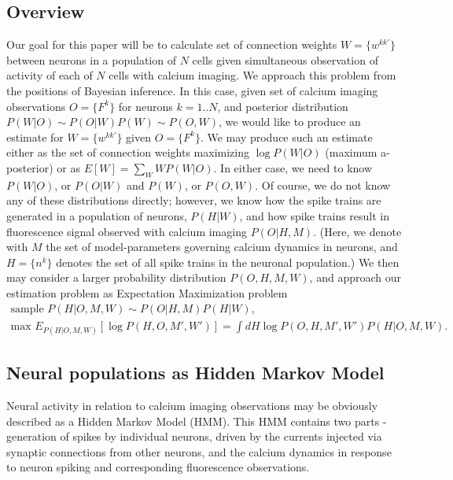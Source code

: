 \documentclass[amsmath,amssymb]{revtex4}
\begin{document}
\subsection{\label{sec:methods:introduction}Overview}
Our goal for this paper will be to calculate set of connection weights $W=\{w^{kk'}\}$ between neurons in a population of $N$ cells given simultaneous observation of activity of each of $N$ cells with calcium imaging. We approach this problem from the positions of Bayesian inference. In this case, given set of calcium imaging observations $O=\{F^k\}$ for neurons $k=1..N$, and posterior distribution $P(W|O)\sim P(O|W)P(W)\sim P(O,W)$, we would like to produce an estimate for $W=\{w^{kk'}\}$ given $O=\{F^k\}$. We may produce such an estimate either as the set of connection weights maximizing $\log P(W|O)$ (maximum a-posterior) or as $E[W]=\sum\limits_W W P(W|O)$. In either case, we need to know $P(W|O)$, or $P(O|W)$ and $P(W)$, or $P(O,W)$. Of course, we do not know any of these distributions directly; however, we know how the spike trains are generated in a population of neurons, $P(H|W)$, and how spike trains result in fluorescence signal observed with calcium imaging $P(O|H,M)$. (Here, we denote with $M$ the set of model-parameters governing calcium dynamics in neurons, and $H=\{n^k\}$ denotes the set of all spike trains in the neuronal population.) We then may consider a larger probability distribution $P(O,H,M,W)$, and
approach our estimation problem as Expectation Maximization problem
\begin{equation}
\begin{array}{l}
\text{sample } P(H|O,M,W)\sim P(O|H,M)P(H|W), \\
\text{max } E_{P(H|O,M,W)}[\log P(H,O,M',W')]=\int dH  \log P(O,H,M',W') P(H|O,M,W).
\end{array}
\end{equation}

\subsection{\label{sec:methods:markov-setup}Neural populations as Hidden Markov Model}
Neural activity in relation to calcium imaging observations may be obviously described as a Hidden Markov Model (HMM). This HMM contains two parts - generation of spikes by individual neurons, driven by the currents injected via synaptic connections from other neurons, and the calcium dynamics in response to neuron spiking and corresponding fluorescence observations.
\end{document}
